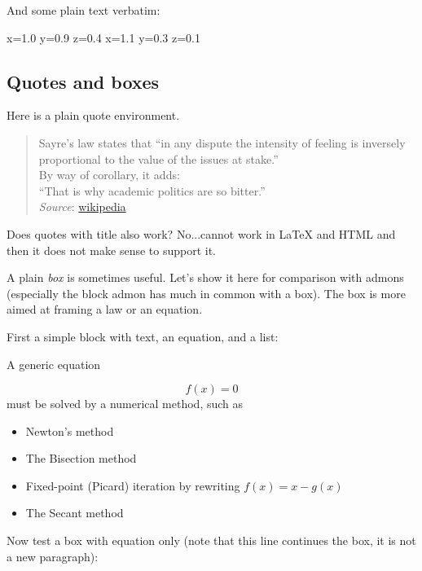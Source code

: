 \documentclass[%
oneside,                 %
final,                   %
10pt]{article}
\begin{document}
And some plain text verbatim:

\bccq
x=1.0 y=0.9 z=0.4
x=1.1 y=0.3 z=0.1
\eccq

\subsection{Quotes and boxes}

Here is a plain quote environment.


\begin{quote}
Sayre's law states that
``in any dispute the intensity of feeling is inversely
proportional to the value of the issues at stake.'' \\
By way of corollary, it adds: \\
``That is why academic politics are so bitter.'' \\
\emph{Source}: \href{{https://en.wikipedia.org/wiki/Sayre's_law}}{wikipedia}
\end{quote}


Does quotes with title also work? No...cannot work in {\LaTeX} and HTML
and then it does not make sense to support it.

A plain \emph{box} is sometimes useful. Let's show it here for comparison
with admons (especially the block admon has much in common with a box).
The box is more aimed at framing a law or an equation.

First a simple block with text, an equation, and a list:


\begin{center}
\begin{Sbox}
\begin{minipage}{0.85\linewidth}
A generic equation

\[ f(x) = 0 \]
must be solved by a numerical method, such as

\begin{itemize}
 \item Newton's method

 \item The Bisection method

 \item Fixed-point (Picard) iteration by rewriting $f(x)=x - g(x)$

 \item The Secant method
\end{itemize}

\noindent
\end{minipage}
\end{Sbox}
\fbox{\TheSbox}
\end{center}
Now test a box with equation only (note that this line continues the
box, it is not a new paragraph):
\end{document}
